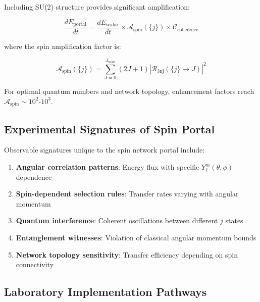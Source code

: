 \documentclass[12pt]{article}
\begin{document}
Including SU(2) structure provides significant amplification:

\begin{equation}
\frac{dE_{\text{portal}}}{dt} = \frac{dE_{\text{scalar}}}{dt} \times \mathcal{A}_{\text{spin}}(\{j\}) \times \mathcal{C}_{\text{coherence}}
\end{equation}

where the spin amplification factor is:

\begin{equation}
\mathcal{A}_{\text{spin}}(\{j\}) = \sum_{J=0}^{J_{\max}} (2J+1) \left|\mathcal{R}_{\text{3nj}}(\{j\} \to J)\right|^2
\end{equation}

For optimal quantum numbers and network topology, enhancement factors reach $\mathcal{A}_{\text{spin}} \sim 10^2$-$10^3$.

\subsection{Experimental Signatures of Spin Portal}

Observable signatures unique to the spin network portal include:

\begin{enumerate}
\item \textbf{Angular correlation patterns}: Energy flux with specific $Y_\ell^m(\theta,\phi)$ dependence
\item \textbf{Spin-dependent selection rules}: Transfer rates varying with angular momentum
\item \textbf{Quantum interference}: Coherent oscillations between different $j$ states
\item \textbf{Entanglement witnesses}: Violation of classical angular momentum bounds
\item \textbf{Network topology sensitivity}: Transfer efficiency depending on spin connectivity
\end{enumerate}

\subsection{Laboratory Implementation Pathways}
\end{document}
